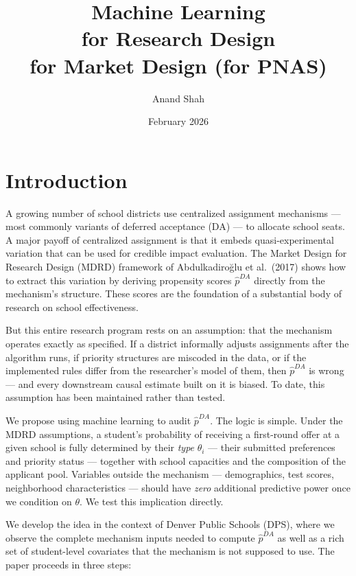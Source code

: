 \documentclass[12pt,a4paper,dvipsnames]{article}
\begin{document}
\title{Machine Learning \\for Research Design \\for Market Design (for PNAS)}
\author{Anand Shah}
\date{February 2026}

\maketitle


\section{Introduction}

A growing number of school districts use centralized assignment mechanisms --- most commonly variants of deferred acceptance (DA) --- to allocate school seats. A major payoff of centralized assignment is that it embeds quasi-experimental variation that can be used for credible impact evaluation. The Market Design for Research Design (MDRD) framework of Abdulkadiro\u{g}lu et al.\ (2017) shows how to extract this variation by deriving propensity scores $\hat{p}^{DA}$ directly from the mechanism's structure. These scores are the foundation of a substantial body of research on school effectiveness.

But this entire research program rests on an assumption: that the mechanism operates exactly as specified. If a district informally adjusts assignments after the algorithm runs, if priority structures are miscoded in the data, or if the implemented rules differ from the researcher's model of them, then $\hat{p}^{DA}$ is wrong --- and every downstream causal estimate built on it is biased. To date, this assumption has been maintained rather than tested.

We propose using machine learning to audit $\hat{p}^{DA}$. The logic is simple. Under the MDRD assumptions, a student's probability of receiving a first-round offer at a given school is fully determined by their \textit{type} $\theta_i$ --- their submitted preferences and priority status --- together with school capacities and the composition of the applicant pool. Variables outside the mechanism --- demographics, test scores, neighborhood characteristics --- should have \textit{zero} additional predictive power once we condition on $\theta$. We test this implication directly.

We develop the idea in the context of Denver Public Schools (DPS), where we observe the complete mechanism inputs needed to compute $\hat{p}^{DA}$ as well as a rich set of student-level covariates that the mechanism is not supposed to use. The paper proceeds in three steps:
\end{document}
